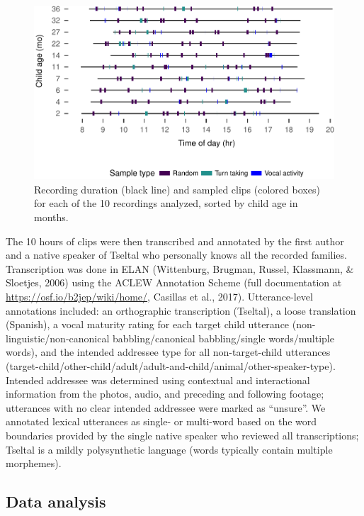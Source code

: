 \documentclass[floatsintext,man]{apa6}
\theoremstyle{definition}
\theoremstyle{definition}
\theoremstyle{definition}
\theoremstyle{remark}
\begin{document}
\begin{figure}
\centering
\includegraphics{Tseltal-CLE_files/figure-latex/fig2-1.pdf}
\caption{\label{fig:fig2}Recording duration (black line) and sampled clips
(colored boxes) for each of the 10 recordings analyzed, sorted by child
age in months.}
\end{figure}

The 10 hours of clips were then transcribed and annotated by the first
author and a native speaker of Tseltal who personally knows all the
recorded families. Transcription was done in ELAN (Wittenburg, Brugman,
Russel, Klassmann, \& Sloetjes, 2006) using the ACLEW Annotation Scheme
(full documentation at \url{https://osf.io/b2jep/wiki/home/}, Casillas
et al., 2017). Utterance-level annotations included: an orthographic
transcription (Tseltal), a loose translation (Spanish), a vocal maturity
rating for each target child utterance (non-linguistic/non-canonical
babbling/canonical babbling/single words/multiple words), and the
intended addressee type for all non-target-child utterances
(target-child/other-child/adult/adult-and-child/animal/other-speaker-type).
Intended addressee was determined using contextual and interactional
information from the photos, audio, and preceding and following footage;
utterances with no clear intended addressee were marked as
\enquote{unsure}. We annotated lexical utterances as single- or
multi-word based on the word boundaries provided by the single native
speaker who reviewed all transcriptions; Tseltal is a mildly
polysynthetic language (words typically contain multiple morphemes).

\subsection{Data analysis}\label{methods-analysisinfo}
\end{document}
